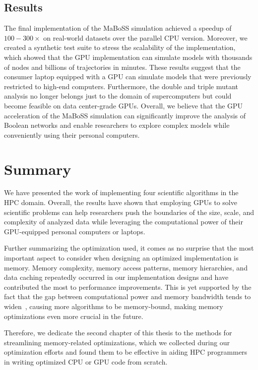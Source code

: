 \subsection{Results}

The final implementation of the MaBoSS simulation achieved a speedup of $100-300\times$ on real-world datasets over the parallel CPU version. Moreover, we created a synthetic test suite to stress the scalability of the implementation, which showed that the GPU implementation can simulate models with thousands of nodes and billions of trajectories in minutes. These results suggest that the consumer laptop equipped with a GPU can simulate models that were previously restricted to high-end computers. Furthermore, the double and triple mutant analysis no longer belongs just to the domain of supercomputers but could become feasible on data center-grade GPUs. Overall, we believe that the GPU acceleration of the MaBoSS simulation can significantly improve the analysis of Boolean networks and enable researchers to explore complex models while conveniently using their personal computers.

\section{Summary}

We have presented the work of implementing four scientific algorithms in the HPC domain. Overall, the results have shown that employing GPUs to solve scientific problems can help researchers push the boundaries of the size, scale, and complexity of analyzed data while leveraging the computational power of their GPU-equipped personal computers or laptops.

Further summarizing the optimization used, it comes as no surprise that the most important aspect to consider when designing an optimized implementation is memory. Memory complexity, memory access patterns, memory hierarchies, and data caching repeatedly occurred in our implementation designs and have contributed the most to performance improvements. This is yet supported by the fact that the gap between computational power and memory bandwidth tends to widen~\cite{zhang2023perks}, causing more algorithms to be memory-bound, making memory optimizations even more crucial in the future.

Therefore, we dedicate the second chapter of this thesis to the methods for streamlining memory-related optimizations, which we collected during our optimization efforts and found them to be effective in aiding HPC programmers in writing optimized CPU or GPU code from scratch.


